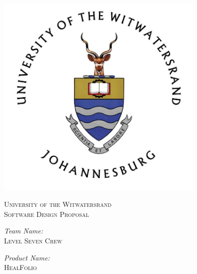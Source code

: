 \documentclass[a4paper]{article}
\begin{document}
\begin{titlepage}

\centering

\vfill

\includegraphics[width=10cm]{Wits-logo1.jpg}

\vskip 0.1cm

\center 

\textsc{\LARGE University of the Witwatersrand}\\[0.5cm] 

\textsc{\Large Software Design Proposal} \\[0.5cm] 

\begin{minipage}{0.4\textwidth}

\begin{center} \large

\emph{Team Name:} \\[0.3cm]

\textsc{Level Seven Crew} \\[0.3cm]

\end{center}

\begin{center} \large

\emph{Product Name:} \\[0.3cm]

\textsc{HealFolio} \\[0.3cm]

\end{center}

\begin{flushleft} \large


\end{flushleft}
\end{minipage}
\end{titlepage}
\end{document}
